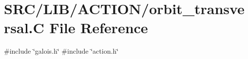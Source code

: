\hypertarget{orbit__transversal_8_c}{}\section{S\+R\+C/\+L\+I\+B/\+A\+C\+T\+I\+O\+N/orbit\+\_\+transversal.C File Reference}
\label{orbit__transversal_8_c}
{\ttfamily \#include \char`\"{}galois.\+h\char`\"{}}\newline
{\ttfamily \#include \char`\"{}action.\+h\char`\"{}}\newline
